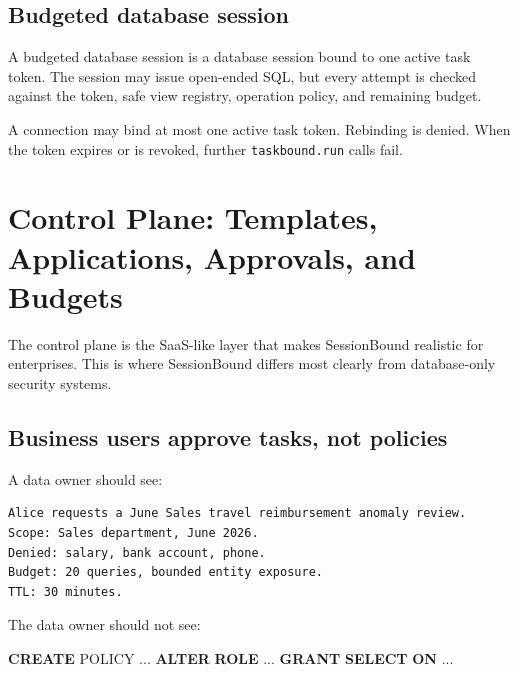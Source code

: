 \documentclass[
]{article}
\newenvironment{Shaded}{}{}
\newcommand{\KeywordTok}[1]{\textcolor[rgb]{0.00,0.44,0.13}{\textbf{#1}}}
\newcommand{\NormalTok}[1]{#1}
\newcommand{\OperatorTok}[1]{\textcolor[rgb]{0.40,0.40,0.40}{#1}}
\begin{document}
\hypertarget{budgeted-database-session}{%
\subsection{Budgeted database
session}\label{budgeted-database-session}}

A budgeted database session is a database session bound to one active
task token. The session may issue open-ended SQL, but every attempt is
checked against the token, safe view registry, operation policy, and
remaining budget.

A connection may bind at most one active task token. Rebinding is
denied. When the token expires or is revoked, further
\texttt{taskbound.run} calls fail.


\hypertarget{control-plane-templates-applications-approvals-and-budgets}{%
\section{Control Plane: Templates, Applications, Approvals, and
Budgets}\label{control-plane-templates-applications-approvals-and-budgets}}

The control plane is the SaaS-like layer that makes SessionBound
realistic for enterprises. This is where SessionBound differs most
clearly from database-only security systems.

\hypertarget{business-users-approve-tasks-not-policies}{%
\subsection{Business users approve tasks, not
policies}\label{business-users-approve-tasks-not-policies}}

A data owner should see:

\begin{verbatim}
Alice requests a June Sales travel reimbursement anomaly review.
Scope: Sales department, June 2026.
Denied: salary, bank account, phone.
Budget: 20 queries, bounded entity exposure.
TTL: 30 minutes.
\end{verbatim}

The data owner should not see:

\begin{Shaded}
\begin{Highlighting}[]
\KeywordTok{CREATE}\NormalTok{ POLICY }\OperatorTok{..}\NormalTok{.}
\KeywordTok{ALTER} \KeywordTok{ROLE} \OperatorTok{..}\NormalTok{.}
\KeywordTok{GRANT} \KeywordTok{SELECT} \KeywordTok{ON} \OperatorTok{..}\NormalTok{.}
\end{Highlighting}
\end{Shaded}
\end{document}
